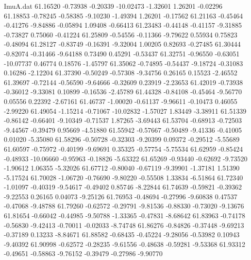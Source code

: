 \begin{filecontents}{ImuA.dat}
  61.16520   -0.73938   -0.20339  -10.02473   -1.32601    1.26201   -0.02296
  61.18853   -0.78245   -0.58385   -9.10230   -1.49394    1.26201   -0.17562
  61.21163   -0.45464   -0.41276   -9.84886   -0.05894    1.09408   -0.66413
  61.23483   -0.44148   -0.41157   -9.31885   -0.73827    0.75060   -0.41224
  61.25809   -0.54556   -0.11366   -9.79622    0.55934    0.75823   -0.48094
  61.28127   -0.83749   -0.16391   -9.32004    1.00205    0.82693   -0.27485
  61.30444   -0.82074   -0.31466   -9.64188    0.73490    0.45291   -0.53437
  61.32751   -0.96550   -0.63051  -10.07737    0.46774    0.18576   -1.45797
  61.35062   -0.74895   -0.54437   -9.18724   -0.31083    0.16286   -2.12204
  61.37390   -0.50249   -0.57308   -9.34756    0.26165    0.15523   -2.46552
  61.39697   -0.72144   -0.56590   -9.64666   -0.32609    0.23919   -2.23653
  61.42019   -0.73938   -0.36012   -9.33081    0.10899   -0.16536   -2.45789
  61.44328   -0.84108   -0.45464   -9.56770    0.05556    0.22392   -2.67161
  61.46737   -1.00020   -0.61137   -9.96611   -0.10473    0.46055   -2.99220
  61.49054   -1.15214   -0.71067  -10.02832   -1.57027    1.83449   -3.38911
  61.51339   -0.86142   -0.66401   -9.10349   -0.71537    1.87265   -3.69443
  61.53704   -0.68913   -0.72503   -9.44567   -0.39479    0.95669   -4.51880
  61.55942   -0.57667   -0.50489   -9.41336   -0.41005    0.01020   -5.35080
  61.58296   -0.50728   -0.32303   -9.20399    0.09372   -0.29512   -5.55689
  61.60597   -0.75972   -0.40199   -9.69691    0.35325   -0.57754   -5.75534
  61.62959   -0.85424   -0.48933  -10.06660   -0.95963   -0.18826   -5.63322
  61.65269   -0.93440   -0.62692   -9.73520   -1.90612    1.06355   -5.32026
  61.67712   -0.80040   -0.67119   -9.39901   -1.37181    1.51390   -5.17524
  61.70028   -1.06720   -0.76690   -9.80220   -0.55508    1.33834   -6.51864
  61.72340   -1.01097   -0.40319   -9.54617   -0.49402    0.85746   -8.22844
  61.74639   -0.59821   -0.39362   -9.22553    0.26165    0.04073   -9.25126
  61.76953   -0.48694   -0.27996   -9.60838    0.47537   -0.47068   -9.48788
  61.79260   -0.62572   -0.29791   -9.81536   -0.88330   -0.73020   -9.13676
  61.81654   -0.66042   -0.44985   -9.50788   -1.33365   -0.47831   -8.68642
  61.83963   -0.74178   -0.56830   -9.42413   -0.70011   -0.02033   -8.74748
  61.86276   -0.84826   -0.37448   -9.69213   -0.37189    0.13233   -8.84671
  61.88582   -0.68435   -0.45224   -9.28056   -0.53982    0.10943   -9.40392
  61.90998   -0.62572   -0.28235   -9.61556   -0.48638   -0.59281   -9.53368
  61.93312   -0.49651   -0.58863   -9.76152   -0.39479   -0.27986   -9.90770

\end{filecontents}
